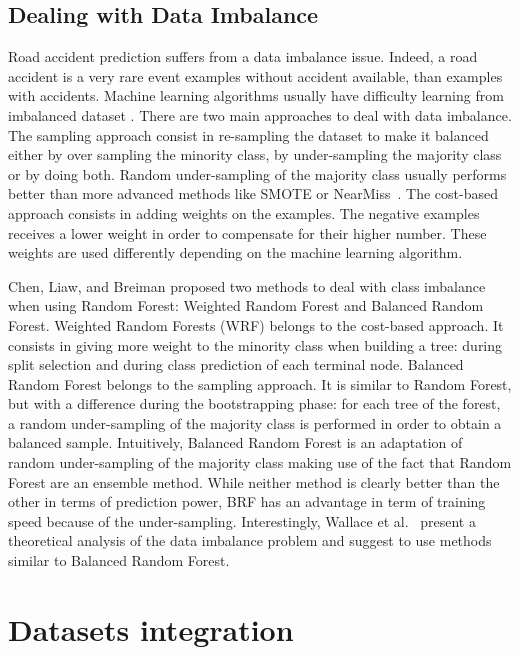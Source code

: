 \documentclass[conference]{IEEEtran}
\newcommand{\english}[1]{\uwave{#1}}  %
\begin{document}
\subsection{Dealing with Data Imbalance}

Road accident prediction suffers from a data imbalance issue. Indeed, a road
accident is a very rare event \english{so we have many more} examples without accident
available, than examples with accidents. Machine learning algorithms usually
have difficulty learning from imbalanced dataset \cite{Branco2016}.
There are two main approaches to deal with data imbalance. The sampling approach
consist in re-sampling the dataset to make it balanced either by over sampling the
minority class, by under-sampling the majority class or by doing both.
Random under-sampling of the majority class usually performs better than
more advanced methods like SMOTE or NearMiss~\cite{Branco2016}.
The cost-based approach consists in adding weights on the examples. The
negative examples receives a lower weight in order to compensate for their
higher number. These weights are used differently depending on the machine
learning algorithm. 

Chen, Liaw, and Breiman\cite{Chen2004} proposed two methods to deal with class imbalance
when using Random Forest: Weighted Random Forest and Balanced Random Forest.
Weighted Random
Forests (WRF) belongs to the cost-based approach. It consists in giving more weight to the minority class when building a tree: during split selection and during 
class prediction of each terminal node. Balanced Random Forest belongs to the sampling
approach. It is similar to Random Forest, but with a
difference during the bootstrapping phase: for each tree of the forest, a random under-sampling of the
majority class is performed in order to obtain a balanced sample. Intuitively,
Balanced Random Forest is an adaptation of random under-sampling of the majority
class making use of the fact that Random Forest are an ensemble method.
While neither method is clearly better than the other in terms of prediction
power, BRF has an advantage in term of training speed because of the under-sampling. Interestingly, Wallace et al.~\cite{Wallace2011} present a theoretical analysis of the data
imbalance problem and suggest to use methods similar to Balanced Random Forest.

\section{Datasets integration}
\end{document}
